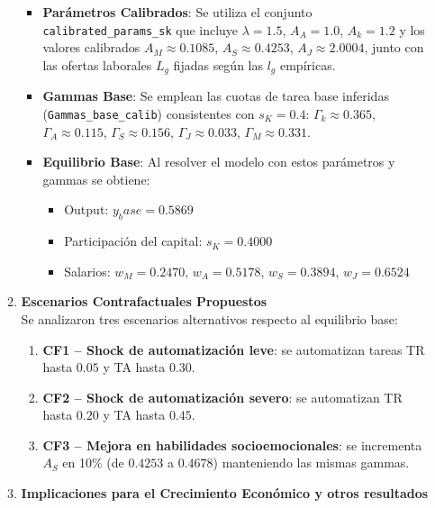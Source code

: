 \documentclass{article}
\theoremstyle{remark}
\theoremstyle{definition}
\begin{document}
\begin{enumerate}
\begin{tcolorbox}[title= Soluci\'on 7]
\begin{enumerate}[label=(\alph*)]
\begin{itemize}
  \item \textbf{Parámetros Calibrados}: Se utiliza el conjunto \texttt{calibrated\_params\_sk} que incluye $\lambda = 1.5$, $A_A = 1.0$, $A_k = 1.2$ y los valores calibrados $A_M \approx 0.1085$, $A_S \approx 0.4253$, $A_J \approx 2.0004$, junto con las ofertas laborales $L_g$ fijadas según las $l_g$ empíricas.
  \item \textbf{Gammas Base}: Se emplean las cuotas de tarea base inferidas (\texttt{Gammas\_base\_calib}) consistentes con $s_K = 0.4$:\; $\Gamma_k \approx 0.365$, $\Gamma_A \approx 0.115$, $\Gamma_S \approx 0.156$, $\Gamma_J \approx 0.033$, $\Gamma_M \approx 0.331$.
  \item \textbf{Equilibrio Base}: Al resolver el modelo con estos parámetros y gammas se obtiene:  
    \begin{itemize}
      \item Output: $y_base=0.5869$
      \item Participación del capital: $s_K=0.4000$
      \item Salarios: $w_M=0.2470$, $w_A=0.5178$, $w_S=0.3894$, $w_J=0.6524$
    \end{itemize}
\end{itemize}

\item \textbf{Escenarios Contrafactuales Propuestos}\\[2pt]
Se analizaron tres escenarios alternativos respecto al equilibrio base:

\begin{enumerate}
  \item \textbf{CF1 – Shock de automatizaci\'on leve}: se automatizan tareas TR hasta $0.05$ y TA hasta $0.30$.
  \item \textbf{CF2 – Shock de automatizaci\'on severo}: se automatizan TR hasta $0.20$ y TA hasta $0.45$.
  \item \textbf{CF3 – Mejora en habilidades socioemocionales}: se incrementa $A_S$ en 10\% (de $0.4253$ a $0.4678$) manteniendo las mismas gammas.
\end{enumerate}


\item \textbf{Implicaciones para el Crecimiento Económico y otros resultados}


\end{enumerate}
\end{tcolorbox}
\end{enumerate}
\end{document}
